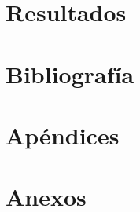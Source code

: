 \documentclass[11pt]{article}
\begin{document}


\chapter{Resultados}

\chapter{Bibliografía}

\chapter{Apéndices}

\chapter{Anexos}
\end{document}
